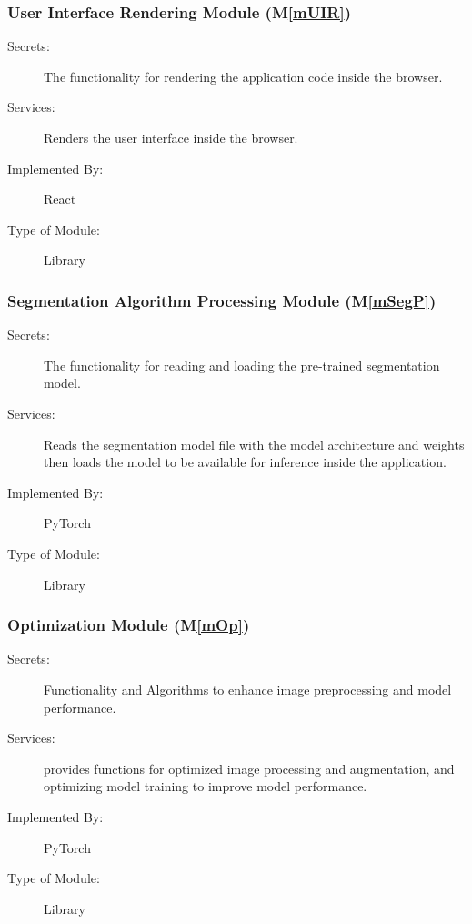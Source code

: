 \documentclass[12pt, titlepage]{article}
\newcommand{\mref}[1]{M\ref{#1}}
\begin{document}
\subsubsection{User Interface Rendering Module  (\mref{mUIR})}

\begin{description}
  \item[Secrets:] The functionality for rendering the application code inside the browser.
  \item[Services:] Renders the user interface inside the browser.
  \item[Implemented By:] React
  \item[Type of Module:] Library
\end{description}

\subsubsection{Segmentation Algorithm Processing Module (\mref{mSegP})}

\begin{description}
  \item[Secrets:] The functionality for reading and loading the pre-trained segmentation model.
  \item[Services:] Reads the segmentation model file with the model architecture and weights then loads 
  the model to be available for inference inside the application. 
  \item[Implemented By:] PyTorch
  \item[Type of Module:] Library
\end{description}

\subsubsection{Optimization Module (\mref{mOp})}

\begin{description}
  \item[Secrets:]Functionality and Algorithms to enhance image preprocessing and model performance.
  \item[Services:] provides functions for optimized image processing and augmentation, and optimizing 
  model training to improve model performance.
  \item[Implemented By:] PyTorch
  \item[Type of Module:] Library
\end{description}
\end{document}
